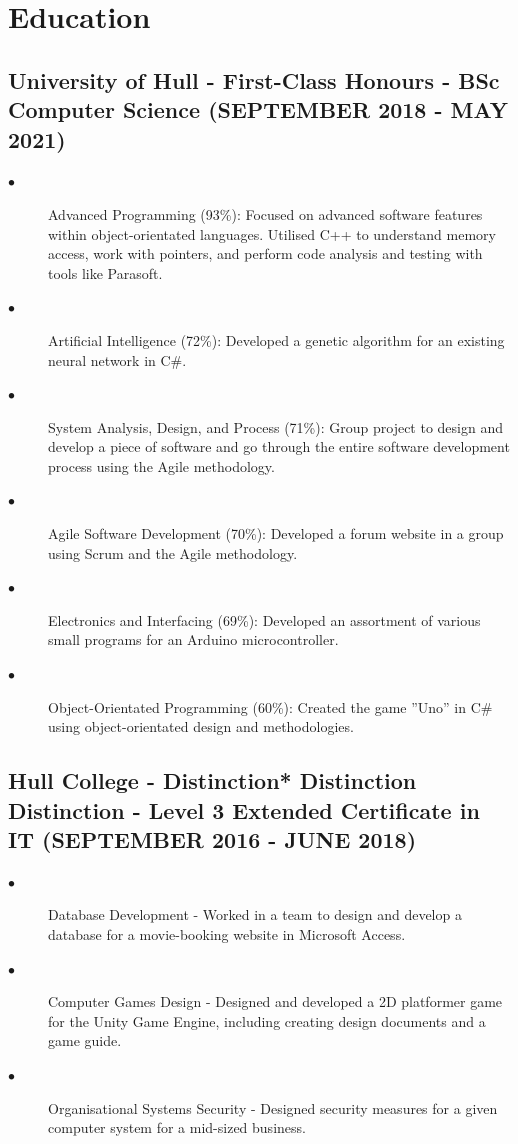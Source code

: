 \documentclass{article}
\begin{document}
\section{Education}
\noindent
\hfill
\begin{minipage}[t]{1\textwidth}
    \subsection{University of Hull - First-Class Honours \textnormal{- BSc Computer Science} \footnotesize{(SEPTEMBER 2018 - MAY 2021)}}
    \normalsize{}
    \begin{description}
        \item[$\bullet$]Advanced Programming (93\%): Focused on advanced software features within object-orientated languages. Utilised C++ to understand memory access, work with pointers, and perform code analysis and testing with tools like Parasoft.
        \item[$\bullet$]Artificial Intelligence (72\%): Developed a genetic algorithm for an existing neural network in C\#.
        \item[$\bullet$]System Analysis, Design, and Process (71\%): Group project to design and develop a piece of software and go through the entire software development process using the Agile methodology.
        \item[$\bullet$]Agile Software Development (70\%): Developed a forum website in a group using Scrum and the Agile methodology.
        \item[$\bullet$]Electronics and Interfacing (69\%): Developed an assortment of various small programs for an Arduino microcontroller.
        \item[$\bullet$]Object-Orientated Programming (60\%): Created the game ”Uno” in C\# using object-orientated design and methodologies.
    \end{description}
    \subsection{Hull College - Distinction* Distinction Distinction \textnormal{- Level 3 Extended Certificate in IT} \footnotesize{(SEPTEMBER 2016 - JUNE 2018)}}
    \normalsize{}
    \begin{description}
        \item[$\bullet$]Database Development - Worked in a team to design and develop a database for a movie-booking website in Microsoft Access.
        \item[$\bullet$]Computer Games Design - Designed and developed a 2D platformer game for the Unity Game Engine, including creating design documents and a game guide.
        \item[$\bullet$]Organisational Systems Security - Designed security measures for a given computer system for a mid-sized business. 
    \end{description}

\end{minipage}
\end{document}
